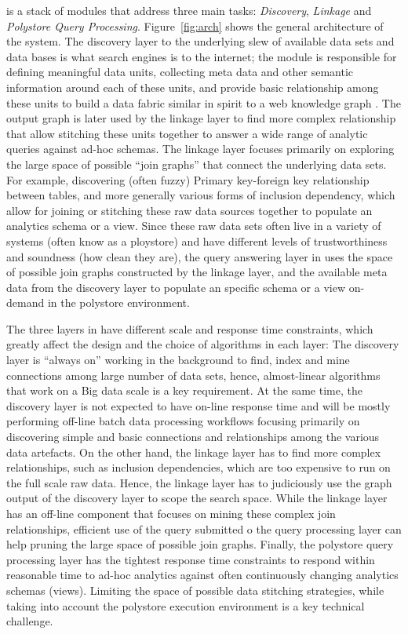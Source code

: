 \dcv is a stack of modules that address three main tasks: {\em Discovery}, 
{\em Linkage} and  {\em Polystore Query Processing}. Figure~\ref{fig:arch} shows the general architecture of the \dcv system. The discovery layer to the underlying slew of available data sets and data bases is what search engines is to the internet; the module is responsible for defining meaningful data units, collecting meta data and other semantic information around each of these units, and provide basic relationship among these units to build a data fabric similar in spirit to a web knowledge graph \cite{DBLP:conf/semweb/AuerBKLCI07,DBLP:conf/sigmod/BollackerEPST08,DBLP:conf/www/SuchanekKW07}. The output graph is later used by the linkage layer to find more complex relationship that allow stitching these units together to answer a wide range of analytic queries against ad-hoc schemas. The linkage layer focuses primarily on exploring the large space of possible ``join graphs'' that connect the underlying data sets. For example, discovering (often fuzzy) Primary key-foreign key relationship between tables, and more generally various forms of inclusion dependency, which allow for joining or stitching these raw data sources together to populate an analytics schema or a view. Since these raw data sets often live in a variety of systems (often know as a ploystore) and have different levels of trustworthiness and soundness (how clean they are), the query answering layer in \dcv uses the space of possible join graphs constructed by the linkage layer, and the available meta data from the discovery layer to populate an specific schema or a view on-demand in the polystore environment.   


The three layers in \dcv have different scale and response time constraints, which greatly affect the design and the choice of algorithms in each layer: The discovery layer is ``always on'' working in the background to find, index and mine connections among large number of data sets, hence, almost-linear algorithms that work on a Big data scale is a key requirement. At the same time, the discovery layer is not expected to have on-line response time and will be mostly performing off-line batch data processing workflows focusing primarily on discovering simple and basic connections and relationships among the various data artefacts. On the other hand, the linkage layer has to find more complex relationships, such as inclusion dependencies, which are too expensive to run on the full scale raw data. Hence, the linkage layer has to judiciously use the graph output of the discovery layer to scope the search space. While the linkage layer has an off-line component that focuses on mining these complex join relationships, efficient use of the query submitted o the query processing layer can help pruning the large space of possible join graphs. Finally, the polystore query processing layer has the tightest response time constraints to respond within reasonable time to ad-hoc analytics against often continuously changing analytics schemas (views). Limiting the space of possible data stitching strategies, while taking into account the polystore execution environment is a key technical challenge. 


